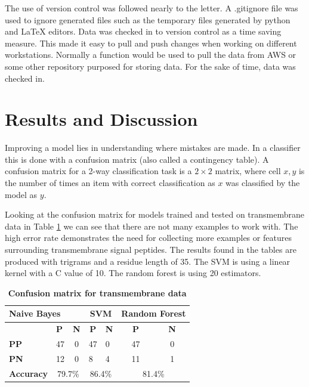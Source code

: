 \documentclass[10pt,letterpaper]{article}
\begin{document}
	The use of version control was followed nearly to the letter. A .gitignore file was used to ignore generated files such as the temporary files generated by python and LaTeX editors. Data was checked in to version control as a time saving measure. This made it easy to pull and push changes when working on different workstations. Normally a function would be used to pull the data from AWS or some other repository purposed for storing data. For the sake of time, data was checked in. 
	\section*{Results and Discussion}
	
	Improving a model lies in understanding where mistakes are made. In a classifier this is done with a confusion matrix (also called a contingency table). A confusion matrix for a 2-way classification task is a $2 \times 2$ matrix, where cell $x,y$ is the number of times an item with correct classification as $x$ was classified by the model as $y$. 

	Looking at the confusion matrix for models trained and tested on transmembrane data in Table \ref{tab:conf-tm} we can see that there are not many examples to work with. The high error rate demonstrates the need for collecting more examples or features surrounding transmembrane signal peptides. The results found in the tables are produced with trigrams and a residue length of 35. The SVM is using a linear kernel with a C value of 10. The random forest is using 20 estimators.
	\begin{table}[!ht]
		\centering
		\caption{{\bf Confusion matrix for transmembrane data}}
		\label{tab:conf-tm}
	\begin{tabular}{lccclcc}
		\multicolumn{3}{l}{Naive Bayes}                                                      & \multicolumn{2}{c}{SVM}                                  & \multicolumn{2}{l}{Random Forest} \\ \hline
		& \multicolumn{1}{l}{\textbf{P}} & \multicolumn{1}{l|}{\textbf{N}} & \textbf{P}             & \multicolumn{1}{c|}{\textbf{N}} & \textbf{P}      & \textbf{N}      \\ \hline
		\textbf{PP}       & 47                             & \multicolumn{1}{c|}{0}          & \multicolumn{1}{l}{47} & \multicolumn{1}{l|}{0}          & 47              & 0               \\
		\textbf{PN}       & 12                             & \multicolumn{1}{c|}{0}          & \multicolumn{1}{l}{8}  & \multicolumn{1}{l|}{4}          & 11              & 1               \\ \hline
		\textbf{Accuracy} & \multicolumn{2}{c}{79.7\%}                                       & \multicolumn{2}{c}{86.4\%}                               & \multicolumn{2}{c}{81.4\%}       
	\end{tabular}
	\end{table}
\end{document}
